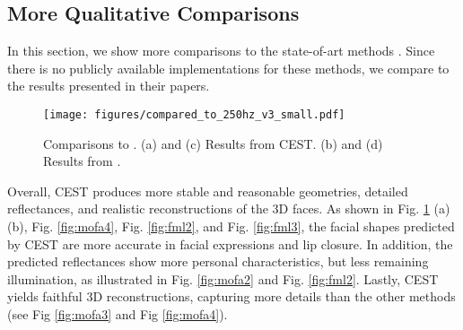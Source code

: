 \begin{appendix}
\subsection{More Qualitative Comparisons}
\label{morequalitative}
In this section, we show more comparisons to the state-of-art methods \cite{booth20173d,sela2017unrestricted,richardson2017learning,thies2016face2face}. Since there is no publicly available implementations for these methods, we compare to the results presented in their papers.
\begin{figure}[t]
  \centering
\renewcommand{\captionlabelfont}{\footnotesize}
  \texttt{[image: figures/compared\_to\_250hz\_v3\_small.pdf]}
  \caption{\footnotesize Comparisons to \cite{tewari2018self}. (a) and (c) Results from CEST. (b) and (d) Results from \cite{tewari2018self}.}\label{fig:250hz}
  \vspace{-0.1in}
\end{figure}

Overall, CEST produces more stable and reasonable geometries, detailed reflectances, and realistic  reconstructions of the 3D faces. As shown in Fig. \ref{fig:250hz} (a) (b), Fig. \ref{fig:mofa4}, Fig. \ref{fig:fml2}, and Fig. \ref{fig:fml3}, the facial shapes predicted by CEST are more accurate in facial expressions and lip closure. In addition, the predicted reflectances show more personal characteristics, but less remaining illumination, as illustrated in Fig. \ref{fig:mofa2} and Fig. \ref{fig:fml2}. Lastly, CEST yields faithful 3D reconstructions, capturing more details than the other methods (see Fig \ref{fig:mofa3} and Fig \ref{fig:mofa4}).



\end{appendix}

